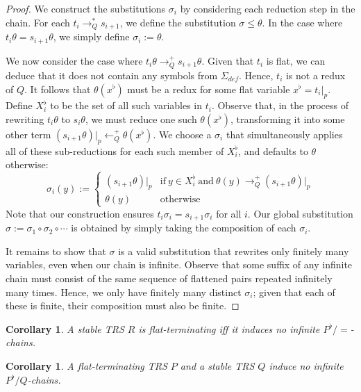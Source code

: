 \documentclass{article}
\newtheorem{corollary}[theorem]{Corollary}
\begin{document}
\begin{proof}
    We construct the substitutions $\sigma_i$ by considering each reduction step in the chain. For each $t_i \rightarrow^*_Q s_{i+1}$, we define the substitution $\sigma \leq \theta$.  In the case where $t_i\theta = s_{i+1}\theta$, we simply define $\sigma_i := \theta$. 
    
    We now consider the case where $t_i \theta \rightarrow^+_Q s_{i+1} \theta$. Given that $t_i$ is flat, we can deduce that it does not contain any symbols from $\Sigma_{def}$. Hence, $t_i$ is not a redux of $Q$. It follows that $\theta(x^\flat)$ must be a redux for some flat variable $x^\flat = t_i |_p$. Define $X_i^\flat$ to be the set of all such variables in $t_i$. Observe that, in the process of rewriting $t_i\theta$ to $s_i\theta$, we must reduce one such $\theta(x^\flat)$, transforming it into some other term $(s_{i+1} \theta)|_p \leftarrow^+_Q \theta(x^\flat)$. We choose a $\sigma_i$ that simultaneously applies all of these sub-reductions for each such member of $X_i^\flat$, and defaults to $\theta$ otherwise: 
    $$\sigma_i(y) := \begin{cases}
        (s_{i+1} \theta)|_p  &\text{if}~ y \in X_i^\flat ~\text{and}~ \theta(y) \rightarrow^+_Q (s_{i+1}\theta)|_p \\
        \theta(y) &\text{otherwise}
    \end{cases}$$
    Note that our construction ensures $t_i\sigma_i = s_{i+1}\sigma_i$ for all $i$. Our global substitution $\sigma := \sigma_1 \circ \sigma_2 \circ \cdots$ is obtained by simply taking the composition of each $\sigma_i$. 
    
    It remains to show that $\sigma$ is a valid substitution that rewrites only finitely many variables, even when our chain is infinite. Observe that some suffix of any infinite chain must consist of the same sequence of flattened pairs repeated infinitely many times. Hence, we only have finitely many distinct $\sigma_i$; given that each of these is finite, their composition must also be finite. 
\end{proof}

\begin{corollary} \label{thm:flat_chain_equality}
    A stable TRS $R$ is flat-terminating iff it induces no infinite $P^\flat/\!\!=$-chains.  
\end{corollary}

\begin{corollary} \label{thm:flat_term_stable}
    A flat-terminating TRS $P$ and a stable TRS $Q$ induce no infinite $P^\flat/Q$-chains.
\end{corollary}
\end{document}
